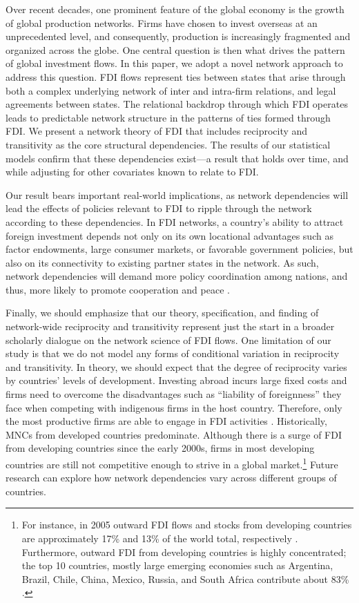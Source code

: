 \documentclass[reqno,onecolumn,letterpaper,12pt]{article}
\begin{document}
Over recent decades, one prominent feature of the global economy is the growth of global production networks. Firms have chosen to invest overseas at an unprecedented level, and consequently, production is increasingly fragmented and organized across the globe. One central question is then what drives the pattern of global investment flows. In this paper, we adopt a novel network approach to address this question. FDI flows represent ties between states that arise through both a complex underlying network of inter and intra-firm relations, and legal agreements between states. The relational backdrop through which FDI operates leads to predictable network structure in the patterns of ties formed through FDI. We present a network theory of FDI that includes reciprocity and transitivity as the core structural dependencies. The results of our statistical models confirm that these dependencies exist---a result that holds over time, and while adjusting for other covariates known to relate to FDI.

Our result bears important real-world implications, as network dependencies will lead the effects of policies relevant to FDI to ripple through the network according to these dependencies. In FDI networks, a country's ability to attract foreign investment depends not only on its own locational advantages such as factor endowments, large consumer markets, or favorable government policies, but also on its connectivity to existing partner states in the network. As such, network dependencies will demand more policy coordination among nations, and thus, more likely to promote cooperation and peace \citep[see,~e.g.,][]{Kim_Solingen:2017,Dorussen_Ward:2008,Dorussen_Ward:2010}.


Finally, we should emphasize that our theory, specification, and finding of network-wide reciprocity and transitivity represent just the start in a broader scholarly dialogue on the network science of FDI flows. One limitation of our study is that we do not model any forms of conditional variation in reciprocity and transitivity. In theory, we should expect that the degree of reciprocity varies by countries' levels of development. Investing abroad incurs large fixed costs and firms need to overcome the disadvantages such as ``liability of foreignness'' they face when competing with indigenous firms in the host country. Therefore, only the most productive firms are able to engage in FDI activities \citep{Melitz:2003,Helpman_et_al:2004}. Historically, MNCs from developed countries predominate. Although there is a surge of FDI from developing countries since the early 2000s, firms in most developing countries are still not competitive enough to strive in a global market.\footnote{For instance, in 2005 outward FDI flows and stocks from developing countries are approximately 17\% and 13\% of the world total, respectively \citep{UNCTAD:2006}. Furthermore, outward FDI from developing countries is highly concentrated; the top 10 countries, mostly large emerging economies such as Argentina, Brazil, Chile, China, Mexico, Russia, and South Africa contribute about 83\% \citep{UNCTAD:2006}. } Future research can explore how network dependencies vary across different groups of countries.
\end{document}
